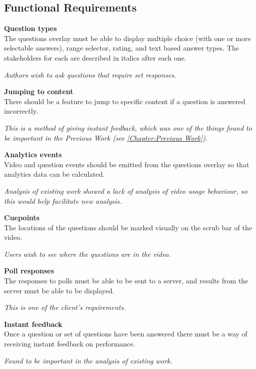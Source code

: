 \subsection{Functional Requirements}
\begin{requirement}[label=\textbf{F\arabic*}]
	\item \textbf{Question types}  \label{Req:Question types} \hfill \\ 
		The questions overlay must be able to display multiple choice (with one or more selectable answers), range selector, rating, and text based answer types. The stakeholders for each are described in italics after each one.

		\textit{Authors wish to ask questions that require set responses.}

	\item \textbf{Jumping to content} \label{Req:Jumping to content} \hfill \\ 
		There should be a feature to jump to specific content if a question is answered incorrectly.

		\textit{This is a method of giving instant feedback, which was one of the things found to be important in the Previous Work (see \autoref{Chapter:Previous Work}).}

	\item \textbf{Analytics events} \label{Req:Analytics events} \hfill \\ 
		Video and question events should be emitted from the questions overlay so that analytics data can be calculated.

		\textit{Analysis of existing work showed a lack of analysis of video usage behaviour, so this would help facilitate new analysis.}

	\item \textbf{Cuepoints} \label{Req:Cuepoints} \hfill \\ 
		The locations of the questions should be marked visually on the \gls{scrub bar} of the video.

		\textit{Users wish to see where the questions are in the video.}

	\item \textbf{Poll responses} \label{Req:Poll responses} \hfill \\ 
		The responses to polls must be able to be sent to a server, and results from the server must be able to be displayed.

		\textit{This is one of the client's requirements.}

	\item \textbf{Instant feedback} \label{Req:Instant feedback} \hfill \\ 
		Once a question or set of questions have been answered there must be a way of receiving instant feedback on performance.

		\textit{Found to be important in the analysis of existing work.}
\end{requirement}

